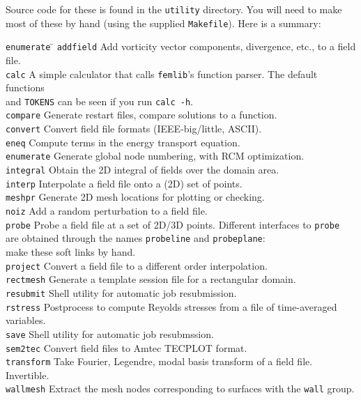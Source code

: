 \documentclass[11pt,a4paper]{report}
\begin{document}
Source code for these is found in the \texttt{utility} directory. You
will need to make most of these by hand (using the supplied
\texttt{Makefile}).  Here is a summary:
\begin{tabbing}
\texttt{enumerate}  \= \kill
\texttt{addfield} \>   
        Add vorticity vector components, divergence, etc., to a field
	file.\\
\texttt{calc} \>      
        A simple calculator that calls \verb+femlib+'s function
        parser. The default functions\\\>and \texttt{TOKENS} can be seen
        if you run \texttt{calc -h}.\\
\texttt{compare} \>   
        Generate restart files, compare solutions to a function.\\
\texttt{convert} \>   
        Convert field file formats (IEEE-big/little, ASCII).\\
\texttt{eneq} \>   
        Compute terms in the energy transport equation.\\
\texttt{enumerate}  \>
        Generate global node numbering, with RCM optimization.\\
\texttt{integral} \> Obtain the 2D integral of fields over the
        domain area.\\
\texttt{interp} \>   
        Interpolate a field file onto a (2D) set of points.\\
\texttt{meshpr} \>    
        Generate 2D mesh locations for plotting or checking.\\
\texttt{noiz} \>      
        Add a random perturbation to a field file.\\
\texttt{probe} \>   
        Probe a field file at a set of 2D/3D points. Different
        interfaces to \texttt{probe}\\ \> are obtained through the names
        \texttt{probeline} and \texttt{probeplane}: \\ \> make these soft
        links by hand.\\
\texttt{project} \>   
        Convert a field file to a different order interpolation.\\
\texttt{rectmesh} \>
        Generate a template session file for a rectangular domain.\\
\texttt{resubmit} \> Shell utility for automatic job resubmission.\\
\texttt{rstress} \>
	Postprocess to compute Reyolds stresses from a file of
        time-averaged variables.\\
\texttt{save} \> Shell utility for automatic job resubmssion.\\
\texttt{sem2tec} \>   
        Convert field files to Amtec TECPLOT format.\\
\texttt{transform} \>      
        Take Fourier, Legendre, modal basis transform of a field
	file. Invertible.\\
\texttt{wallmesh} \>      
        Extract the mesh nodes corresponding to surfaces with the
	\verb+wall+ group.
\end{tabbing}
\end{document}
